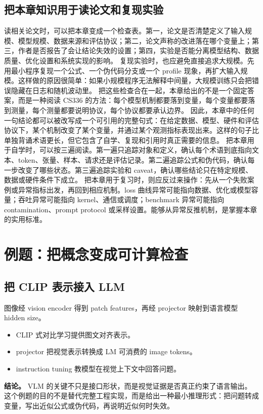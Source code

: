 \documentclass[a4paper]{article}
\begin{document}
\subsection{把本章知识用于读论文和复现实验}
读相关论文时，可以把本章变成一个检查表。第一，论文是否清楚定义了输入规模、模型规模、数据来源和评估协议；第二，论文声称的改进落在哪个变量上；第三，作者是否报告了会让结论失效的设置；第四，实验是否能分离模型结构、数据质量、优化设置和系统实现的影响。
复现实验时，也应避免直接追求大规模。先用最小程序复现一个公式、一个伪代码分支或一个 profile 现象，再扩大输入规模。这样做的原因很简单：如果小规模程序无法解释中间量，大规模训练只会把错误隐藏在日志和随机波动里。
把这些检查合在一起，本章给出的不是一个固定答案，而是一种阅读 CS336 的方法：每个模型机制都要落到变量，每个变量都要落到测量，每个测量都要说明协议，每个协议都要承认边界。
因此，本章中的任何一句结论都可以被改写成一个可引用的完整句式：在给定数据、模型、硬件和评估协议下，某个机制改变了某个变量，并通过某个观测指标表现出来。这样的句子比单独背诵术语更长，但它包含了自学、复现和引用时真正需要的信息。
把本章用于自学时，可以按三遍阅读。第一遍只追踪对象和定义，确认每个术语到底指向文本、token、张量、样本、请求还是评估记录。第二遍追踪公式和伪代码，确认每一步改变了哪些状态。第三遍追踪实验和 caveat，确认哪些结论只在特定规模、数据或硬件条件下成立。
把本章用于复习时，则应反过来操作：先从一个失败案例或异常指标出发，再回到相应机制。loss 曲线异常可能指向数据、优化或模型容量；吞吐异常可能指向 kernel、通信或调度；benchmark 异常可能指向 contamination、prompt protocol 或采样设置。能够从异常反推机制，是掌握本章的实用标准。
\section{例题：把概念变成可计算检查}
\subsection{把 CLIP 表示接入 LLM}
图像经 vision encoder 得到 patch features，再经 projector 映射到语言模型 hidden size。
\begin{itemize}
\item CLIP 式对比学习提供图文对齐表示。
\item projector 把视觉表示转换成 LM 可消费的 image tokens。
\item instruction tuning 教模型在视觉上下文中回答问题。
\end{itemize}
\textbf{结论。} VLM 的关键不只是接口形状，而是视觉证据是否真正约束了语言输出。
这个例题的目的不是替代完整工程实现，而是给出一种最小推理形式：把问题转成变量，写出近似公式或伪代码，再说明近似何时失效。
\end{document}
